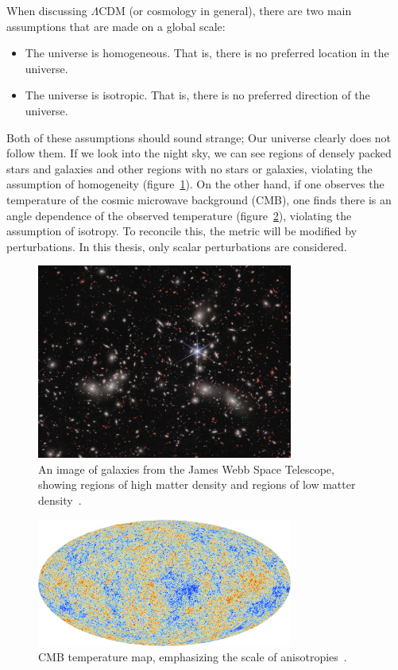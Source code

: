 When discussing $\Lambda$CDM (or cosmology in general), there are two main assumptions that are made on a global scale:
\begin{itemize}
    \item The universe is homogeneous. That is, there is no preferred location in the universe.
    \item The universe is isotropic. That is, there is no preferred direction of the universe.
\end{itemize}
Both of these assumptions should sound strange; Our universe clearly does not follow them. If we look into the night sky, we can see regions of densely packed stars and galaxies and other regions with no stars or galaxies, violating the assumption of homogeneity (figure~\ref{fig:galaxy_map}). On the other hand, if one observes the temperature of the cosmic microwave background (CMB), one finds there is an angle dependence of the observed temperature (figure~\ref{fig:cmb_tt_map}), violating the assumption of isotropy. To reconcile this, the metric will be modified by perturbations. In this thesis, only scalar perturbations are considered.
\begin{figure}[ht]
    \centering
    \includegraphics[width=0.75\textwidth]{plots/weic2305a.jpg}
    \caption{An image of galaxies from the James Webb Space Telescope, showing regions of high matter density and regions of low matter density~\cite{webb_clusters}.}
    \label{fig:galaxy_map}
\end{figure}
\begin{figure}[ht]
    \centering
    \includegraphics[width=0.75\textwidth]{plots/Planck_CMB.jpg}
    \caption{CMB temperature map, emphasizing the scale of anisotropies~\cite{planck_CMB}.}
    \label{fig:cmb_tt_map}
\end{figure}


